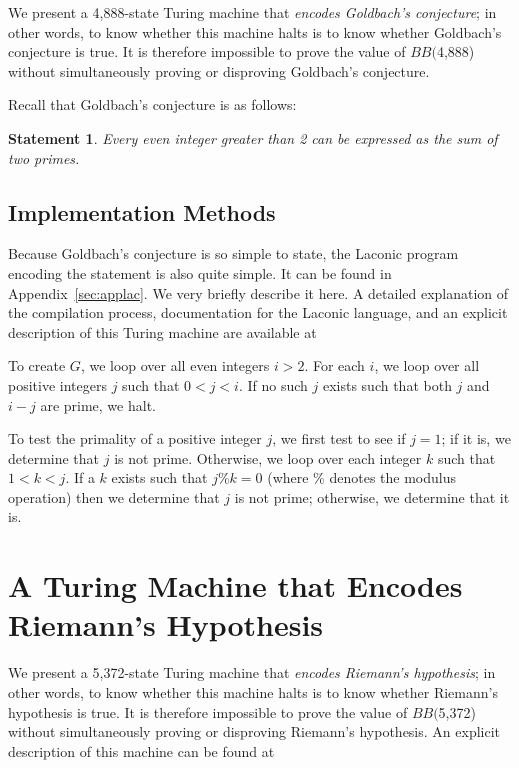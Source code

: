\documentclass[11pt]{article}
\newtheorem{statement}{Statement}
\newcommand{\gbstatenumstate}{4,888-state }
\newcommand{\bbgbstatenum}{$BB($4,888) }
\newcommand{\rmstatenumstate}{5,372-state }
\newcommand{\bbrmstatenum}{$BB($5,372) }
\begin{document}
We present a \gbstatenumstate Turing machine that \emph{encodes Goldbach's conjecture}; in other words, to know whether this machine halts is to know whether Goldbach's conjecture is true. It is therefore impossible to prove the value of \bbgbstatenum without simultaneously proving or disproving Goldbach's conjecture.

Recall that Goldbach's conjecture is as follows:

\begin{statement}
\emph{Every even integer greater than 2 can be expressed as the sum of two primes.}
\label{goldbachstatement}
\end{statement}

\subsection{Implementation Methods}

Because Goldbach's conjecture is so simple to state, the Laconic program encoding the statement is also quite simple. It can be found in Appendix~\ref{sec:applac}. We very briefly describe it here. A detailed explanation of the compilation process, documentation for the Laconic language, and an explicit description of this Turing machine are available at~\cite{github}

To create $G$, we loop over all even integers $i > 2$. For each $i$, we loop over all positive integers $j$ such that $0 < j < i$. If no such $j$ exists such that both $j$ and $i - j$ are prime, we halt.

To test the primality of a positive integer $j$, we first test to see if $j = 1$; if it is, we determine that $j$ is not prime. Otherwise, we loop over each integer $k$ such that $1 < k < j$. If a $k$ exists such that $j \% k = 0$ (where \% denotes the modulus operation) then we determine that $j$ is not prime; otherwise, we determine that it is.

\section{A Turing Machine that Encodes Riemann's Hypothesis}

We present a \rmstatenumstate Turing machine that \emph{encodes Riemann's hypothesis}; in other words, to know whether this machine halts is to know whether Riemann's hypothesis is true. It is therefore impossible to prove the value of \bbrmstatenum without simultaneously proving or disproving Riemann's hypothesis. An explicit description of this machine can be found at~\cite{github}
\end{document}
